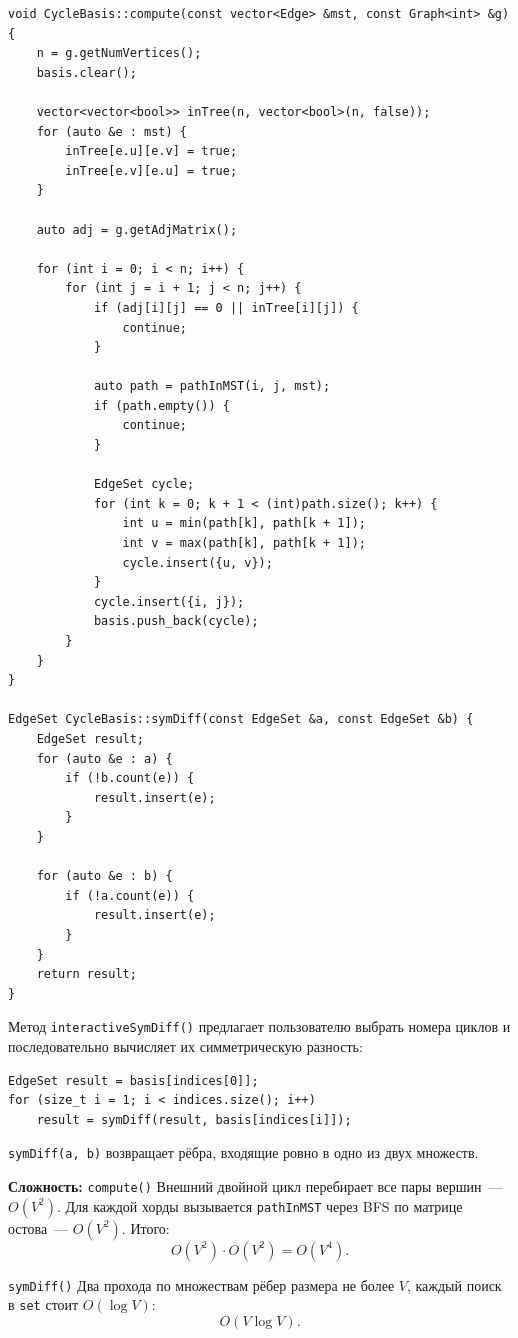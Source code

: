 \begin{lstlisting}[style=cstyle, caption={Построение фундаментального цикла и симметрическая разность (cycle\_basis.cpp)}]
void CycleBasis::compute(const vector<Edge> &mst, const Graph<int> &g) {
	n = g.getNumVertices();
	basis.clear();

	vector<vector<bool>> inTree(n, vector<bool>(n, false));
	for (auto &e : mst) {
		inTree[e.u][e.v] = true;
		inTree[e.v][e.u] = true;
	}

	auto adj = g.getAdjMatrix();

	for (int i = 0; i < n; i++) {
		for (int j = i + 1; j < n; j++) {
			if (adj[i][j] == 0 || inTree[i][j]) {
				continue;
			}

			auto path = pathInMST(i, j, mst);
			if (path.empty()) {
				continue;
			}

			EdgeSet cycle;
			for (int k = 0; k + 1 < (int)path.size(); k++) {
				int u = min(path[k], path[k + 1]);
				int v = max(path[k], path[k + 1]);
				cycle.insert({u, v});
			}
			cycle.insert({i, j});
			basis.push_back(cycle);
		}
	}
}

EdgeSet CycleBasis::symDiff(const EdgeSet &a, const EdgeSet &b) {
	EdgeSet result;
	for (auto &e : a) {
		if (!b.count(e)) {
			result.insert(e);
		}
	}

	for (auto &e : b) {
		if (!a.count(e)) {
			result.insert(e);
		}
	}
	return result;
}
\end{lstlisting}

Метод \texttt{interactiveSymDiff()} предлагает пользователю выбрать
номера циклов и последовательно вычисляет их симметрическую разность:

\begin{lstlisting}[style=cstyle, caption={Симметрическая разность циклов (cycle\_basis.cpp)}]
EdgeSet result = basis[indices[0]];
for (size_t i = 1; i < indices.size(); i++)
    result = symDiff(result, basis[indices[i]]);
\end{lstlisting}

\texttt{symDiff(a, b)} возвращает рёбра, входящие ровно в одно из двух
множеств.

\textbf{Сложность:}
 \texttt{compute()}
Внешний двойной цикл перебирает все пары вершин~--- $O(V^2)$.
Для каждой хорды вызывается \texttt{pathInMST} через BFS по матрице
остова~--- $O(V^2)$.
Итого:
\[
    O(V^2) \cdot O(V^2) = O(V^4).
\]

\texttt{symDiff()}
Два прохода по множествам рёбер размера не более $V$,
каждый поиск в \texttt{set} стоит $O(\log V)$:
\[
    O(V \log V).
\]